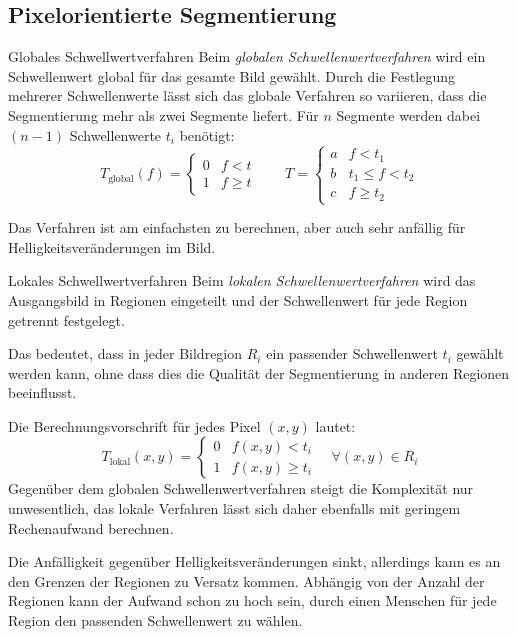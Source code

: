 \subsection{Pixelorientierte Segmentierung}

\begin{defi}{Globales Schwellwertverfahren}
    Beim \emph{globalen Schwellenwertverfahren} wird ein Schwellenwert global für das gesamte Bild gewählt.
    Durch die Festlegung mehrerer Schwellenwerte lässt sich das globale Verfahren so variieren, dass die Segmentierung mehr als zwei Segmente liefert.
    Für $n$ Segmente werden dabei $(n-1)$ Schwellenwerte $t_i$ benötigt:
    \[
        T_{\text{global}}(f) =
        \begin{cases}
            0 & f < t    \\
            1 & f \geq t
        \end{cases}
        \qquad T =
        \begin{cases}
            a & f < t_1          \\
            b & t_1 \leq f < t_2 \\
            c & f \geq t_2
        \end{cases}
    \]

    Das Verfahren ist am einfachsten zu berechnen, aber auch sehr anfällig für Helligkeitsveränderungen im Bild.
\end{defi}

\begin{defi}{Lokales Schwellwertverfahren}
    Beim \emph{lokalen Schwellenwertverfahren} wird das Ausgangsbild in Regionen eingeteilt und der Schwellenwert für jede Region getrennt festgelegt.

    Das bedeutet, dass in jeder Bildregion $R_i$ ein passender Schwellenwert $t_i$ gewählt werden kann, ohne dass dies die Qualität der Segmentierung in anderen Regionen beeinflusst.

    Die Berechnungsvorschrift für jedes Pixel $(x,y)$ lautet:
    \[
        T_{\text{lokal}}(x, y) =
        \begin{cases}
            0 & f(x, y) < t_i    \\
            1 & f(x, y) \geq t_i
        \end{cases}
        \quad \forall (x, y) \in R_i
    \]
    Gegenüber dem globalen Schwellenwertverfahren steigt die Komplexität nur unwesentlich, das lokale Verfahren lässt sich daher ebenfalls mit geringem Rechenaufwand berechnen.

    Die Anfälligkeit gegenüber Helligkeitsveränderungen sinkt, allerdings kann es an den Grenzen der Regionen zu Versatz kommen. Abhängig von der Anzahl der Regionen kann der Aufwand schon zu hoch sein, durch einen Menschen für jede Region den passenden Schwellenwert zu wählen.
\end{defi}

